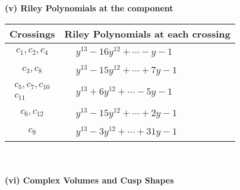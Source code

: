 \documentclass[1p]{elsarticle_modified}
\theoremstyle{definition}
\begin{document}
\newpage\renewcommand{\arraystretch}{1}
\flushleft \textbf{(v) Riley Polynomials at the component}\newline \\
\begin{tabular}{m{50pt}|m{274pt}}
Crossings & \hspace{64pt}Riley Polynomials at each crossing \\
\hline $$\begin{aligned}c_{1},c_{2},c_{4}\end{aligned}$$&$\begin{aligned}
&y^{13}-16 y^{12}+\cdots- y-1
\end{aligned}$\\
\hline $$\begin{aligned}c_{3},c_{8}\end{aligned}$$&$\begin{aligned}
&y^{13}-15 y^{12}+\cdots+7 y-1
\end{aligned}$\\
\hline $$\begin{aligned}c_{5},c_{7},c_{10}\\c_{11}\end{aligned}$$&$\begin{aligned}
&y^{13}+6 y^{12}+\cdots-5 y-1
\end{aligned}$\\
\hline $$\begin{aligned}c_{6},c_{12}\end{aligned}$$&$\begin{aligned}
&y^{13}-15 y^{12}+\cdots+2 y-1
\end{aligned}$\\
\hline $$\begin{aligned}c_{9}\end{aligned}$$&$\begin{aligned}
&y^{13}-3 y^{12}+\cdots+31 y-1
\end{aligned}$\\
\hline
\end{tabular}\\~\\
\newpage\flushleft \textbf{(vi) Complex Volumes and Cusp Shapes}
\end{document}
